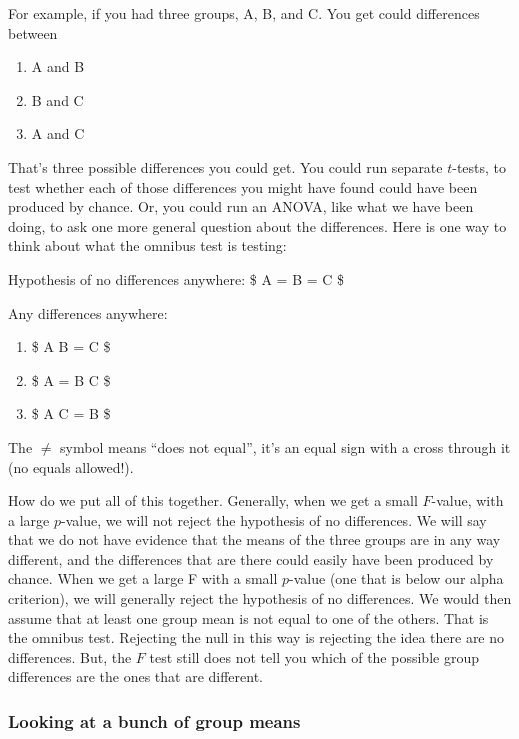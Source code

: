 \documentclass[
  letterpaper,
  DIV=11,
  numbers=noendperiod]{scrreprt}
\providecommand{\tightlist}{%
  \setlength{\itemsep}{0pt}\setlength{\parskip}{0pt}}
\begin{document}
For example, if you had three groups, A, B, and C. You get could
differences between

\begin{enumerate}
\def\labelenumi{\arabic{enumi}.}
\tightlist
\item
  A and B
\item
  B and C
\item
  A and C
\end{enumerate}

That's three possible differences you could get. You could run separate
\(t\)-tests, to test whether each of those differences you might have
found could have been produced by chance. Or, you could run an ANOVA,
like what we have been doing, to ask one more general question about the
differences. Here is one way to think about what the omnibus test is
testing:

Hypothesis of no differences anywhere: \$ A = B = C \$

Any differences anywhere:

\begin{enumerate}
\def\labelenumi{\alph{enumi}.}
\tightlist
\item
  \$ A \neq B = C \$
\item
  \$ A = B \neq C \$
\item
  \$ A \neq C = B \$
\end{enumerate}

The \(\neq\) symbol means ``does not equal'', it's an equal sign with a
cross through it (no equals allowed!).

How do we put all of this together. Generally, when we get a small
\(F\)-value, with a large \(p\)-value, we will not reject the hypothesis
of no differences. We will say that we do not have evidence that the
means of the three groups are in any way different, and the differences
that are there could easily have been produced by chance. When we get a
large F with a small \(p\)-value (one that is below our alpha
criterion), we will generally reject the hypothesis of no differences.
We would then assume that at least one group mean is not equal to one of
the others. That is the omnibus test. Rejecting the null in this way is
rejecting the idea there are no differences. But, the \(F\) test still
does not tell you which of the possible group differences are the ones
that are different.

\subsubsection{Looking at a bunch of group
means}\label{looking-at-a-bunch-of-group-means}
\end{document}
